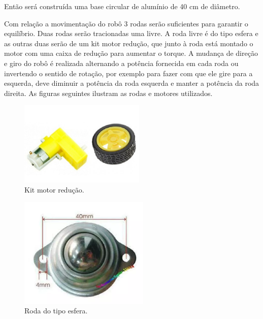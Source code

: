 
			Então será construída uma base circular de alumínio de 40 cm de diâmetro.

        	Com relação a movimentação do robô 3 rodas serão suficientes para garantir o equilíbrio. Duas rodas serão tracionadas uma livre.  A roda livre é do tipo esfera e as outras duas serão de um kit motor redução, que junto à roda está montado o motor com uma caixa de redução para aumentar o torque. A mudança de direção e giro do robô é realizada alternando a potência fornecida em cada roda ou invertendo o sentido de rotação, por exemplo para fazer com que ele gire para a esquerda, deve diminuir a potência da roda esquerda e manter a potência da roda direita. As figuras seguintes ilustram as rodas e motores utilizados.

        	\begin{figure}[H]
				\centering
				\includegraphics[scale=0.7]{figuras/motor_roda.png}
				\caption{Kit motor redução.}
				\label{img:kit_motor}
			\end{figure}

			\begin{figure}[H]
				\centering
				\includegraphics[scale=0.7]{figuras/esfera.png}
				\caption{Roda do tipo esfera.}
				\label{img:esfera}
			\end{figure}

